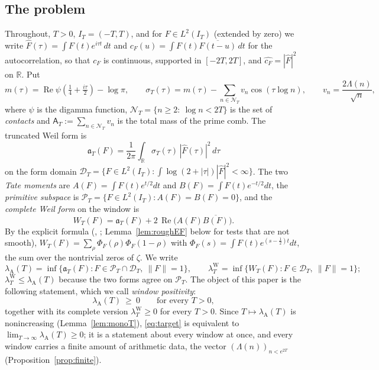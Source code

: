 \documentclass[11pt]{amsart}
\theoremstyle{definition}
\theoremstyle{remark}
\newcommand{\R}{\mathbb R}
\newcommand{\Rel}{\operatorname{Re}}
\newcommand{\PT}{\mathcal P_T}
\newcommand{\IT}{I_T}
\newcommand{\lamW}{\lambda^{\mathrm W}_T}
\newcommand{\lamA}{\lambda_{\mathrm A}(T)}
\newcommand{\sT}{\sigma_T}
\newcommand{\Fh}{\widehat F}
\newcommand{\cF}{c_F}
\newcommand{\NT}{\mathcal N_T}
\newcommand{\Aconst}{\mathsf A_T}
\begin{document}
\subsection{The problem}
Throughout, $T>0$, $\IT=(-T,T)$, and for $F\in L^2(\IT)$ (extended by zero) we write
$\Fh(\tau)=\int F(t)e^{i\tau t}\,dt$ and $\cF(u)=\int F(t)\overline{F(t-u)}\,dt$ for the
autocorrelation, so that $\cF$ is continuous, supported in $[-2T,2T]$, and
$\widehat{\cF}=|\Fh|^2$ on $\R$. Put
\begin{equation}\label{eq:symbol}
m(\tau)=\Rel\psi\!\left(\tfrac14+\tfrac{i\tau}{2}\right)-\log\pi,\qquad
\sT(\tau)=m(\tau)-\sum_{n\in\NT}v_n\cos(\tau\log n),\qquad v_n=\frac{2\Lambda(n)}{\sqrt n},
\end{equation}
where $\psi$ is the digamma function, $\NT=\{n\ge2:\ \log n<2T\}$ is the set of \emph{contacts} and
$\Aconst:=\sum_{n\in\NT}v_n$ is the total mass of the prime comb. The truncated Weil form is
\begin{equation}\label{eq:form}
\mathfrak a_T(F)=\frac1{2\pi}\int_\R\sT(\tau)\,|\Fh(\tau)|^2\,d\tau
\end{equation}
on the form domain $\mathcal D_T=\{F\in L^2(\IT):\int\log(2+|\tau|)|\Fh|^2<\infty\}$. The two \emph{Tate
moments} are $A(F)=\int F(t)e^{t/2}dt$ and $B(F)=\int F(t)e^{-t/2}dt$, the \emph{primitive subspace} is
$\PT=\{F\in L^2(\IT):A(F)=B(F)=0\}$, and the \emph{complete Weil form} on the window is
\begin{equation}\label{eq:W}
W_T(F)=\mathfrak a_T(F)+2\,\Rel\big(A(F)\overline{B(F)}\big).
\end{equation}
By the explicit formula (\cite{Weil52}, \cite[Thm.~8.4]{Paper45}; Lemma~\ref{lem:roughEF} below for
tests that are not smooth), $W_T(F)=\sum_\rho\Phi_F(\rho)\Phi_F(1-\rho)$ with
$\Phi_F(s)=\int F(t)e^{(s-\frac12)t}dt$, the sum over the nontrivial zeros of $\zeta$. We write
\[
\lamA=\inf\{\mathfrak a_T(F):F\in\PT\cap\mathcal D_T,\ \|F\|=1\},\qquad
\lamW=\inf\{W_T(F):F\in\mathcal D_T,\ \|F\|=1\};
\]
$\lamW\le\lamA$ because the two forms agree on $\PT$. The object of this paper is the following
statement, which we call \emph{window positivity}:
\begin{equation}\label{eq:target}
\lamA\ \ge\ 0\qquad\text{for every }T>0 ,
\end{equation}
together with its complete version $\lamW\ge0$ for every $T>0$. Since $T\mapsto\lamA$ is nonincreasing
(Lemma~\ref{lem:monoT}), \eqref{eq:target} is equivalent to $\lim_{T\to\infty}\lamA\ge0$; it is a
statement about every window at once, and every window carries a finite amount of arithmetic data, the
vector $(\Lambda(n))_{n<e^{2T}}$ (Proposition~\ref{prop:finite}).
\end{document}
